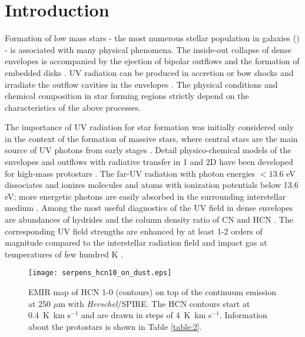 \documentclass{aa}
\begin{document}
\section{Introduction} 

Formation of low mass stars - the most numerous stellar population in galaxies (\citealt{Kro02})
- is associated with many physical phenomena. The inside-out collapse of dense envelopes
 is accompanied by the ejection of bipolar outflows and the formation of embedded disks \citep{Fra14,Har15}.
UV radiation can be produced in accretion or bow shocks and irradiate the outflow cavities 
in the envelopes \citealt{Spa95,vK09}. The physical conditions and chemical 
composition in star forming regions strictly depend on the characteristics of the above processes. 

The importance of UV radiation for star formation was initially considered only in the context 
of the formation of massive stars, where central stars are the main source of UV photons from early stages \citep{Ces05,ZY07}. 
Detail physico-chemical models of the envelopes and outflows with radiative transfer in 1 and 2D have been
 developed for high-mass protostars \citep{DN97,Sta05,Bru07}. The far-UV radiation with 
 photon energies $<13.6$ eV dissociates and ionizes molecules and
atoms with ionization potentials below 13.6 eV; more energetic photons are easily absorbed 
in the surrounding interstellar medium \citep{Ger16}. Among the most useful diagnostics
 of the UV field in dense envelopes are abundances of hydrides and the column density ratio of CN and HCN \citep{Sta07}. 
The corresponding UV field strengths are enhanced by at least 1-2 orders of magnitude
compared to the interstellar radiation field and impact gas at temperatures of few hundred K \citep{Sta07,Ben16}. 
\begin{figure} [tb]
\begin{center}
\texttt{[image: serpens\_hcn10\_on\_dust.eps]} 
\caption{EMIR map of HCN 1-0 (contours) on top of the continuum emission at 250 $\mu$m
 with \textit{Herschel}/SPIRE. The HCN contours start at 0.4~K~km s$^{-1}$ and are drawn in steps 
 of 4~K~km s$^{-1}$. Information about the protostars is shown in Table \ref{table:2}.} 
\label{seds} 
\end{center}
\end{figure}
\end{document}
